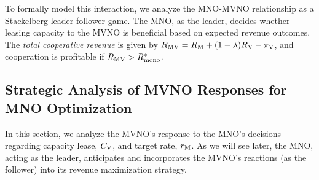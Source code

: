 \documentclass[12pt, draftclsnofoot, onecolumn]{IEEEtran}
\begin{document}
		To formally model this interaction, we analyze the MNO-MVNO relationship as a Stackelberg leader-follower game. The MNO, as the leader, decides whether leasing capacity to the MVNO is beneficial based on expected revenue outcomes. The \emph{total cooperative revenue} is given by \( R_{\rm MV} = R_{\rm M} + (1 - \lambda) R_{\rm V} - \pi_{\rm V} \), and cooperation is profitable if \( R_{\rm MV} > R^*_{\rm mono} \). 
		
		
		
		\subsection{Strategic Analysis of MVNO Responses for MNO Optimization}
		In this section, we analyze the MVNO's response to the MNO's decisions regarding capacity lease, \(C_{\rm V}\), and target rate, \(r_{\rm M}\). As we will see later, the MNO, acting as the leader, anticipates and incorporates the MVNO's reactions (as the follower) into its revenue maximization strategy.
		
\end{document}
